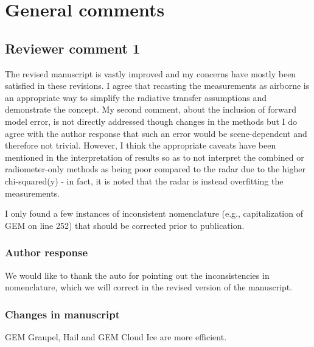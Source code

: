 \section{General comments}

\subsection*{Reviewer comment 1}

The revised manuscript is vastly improved and my concerns have mostly been
satisfied in these revisions. I agree that recasting the measurements as
airborne is an appropriate way to simplify the radiative transfer assumptions
and demonstrate the concept. My second comment, about the inclusion of forward
model error, is not directly addressed though changes in the methods but I do
agree with the author response that such an error would be scene-dependent and
therefore not trivial. However, I think the appropriate caveats have been
mentioned in the interpretation of results so as to not interpret the combined
or radiometer-only methods as being poor compared to the radar due to the higher
chi-squared(y) - in fact, it is noted that the radar is instead overfitting the
measurements.

I only found a few instances of inconsistent nomenclature (e.g., capitalization
of GEM on line 252) that should be corrected prior to publication.

\subsubsection*{Author response}

We would like to thank the auto for pointing out the inconsistencies in nomenclature, which
we will correct in the revised version of the manuscript.


\subsubsection*{Changes in manuscript}

\begin{change}[230]
GEM Graupel, \DIFdelbegin {}\DIFdelend \DIFaddbegin {}\DIFaddend Hail and GEM Cloud Ice are more efficient.
\end{change}
